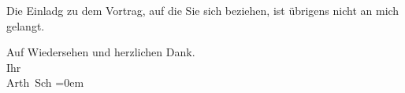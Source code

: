 \pstart
           Die Einladg zu dem Vortrag, auf die Sie sich beziehen, ist übrigens nicht an mich
               gelangt.\pend
           
\pstart
           Auf Wiedersehen und herzlichen Dank. {\\[\baselineskip]}Ihr {\\[\baselineskip]}\spacefill\mbox{Arth Sch}\pend
           \leftskip=0em{}\endnumbering{}  
      